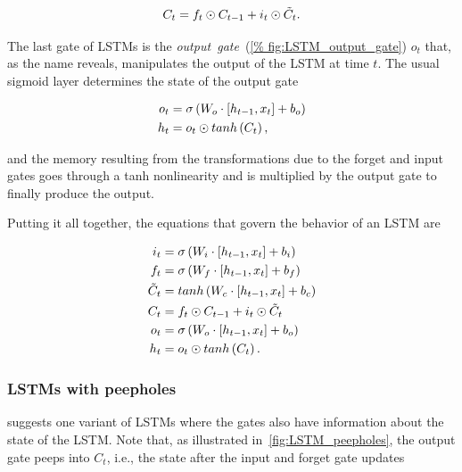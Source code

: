 \begin{equation}\label{eq:LSTM_state_update}
    C_t = f_t \odot C_{t-1} + i_t \odot \tilde C_t.
\end{equation}

The last gate of LSTMs is the \emph{output~gate}~(\autoref{%
fig:LSTM_output_gate}) $o_t$ that, as the name reveals, manipulates the output
of the LSTM at time $t$. The usual sigmoid layer determines the state of the
output gate

\begin{equation}\label{eq:LSTM_output_gate}
\begin{split}
    o_t &= \sigma\left(W_o \cdot \left[h_{t-1}, x_t\right] + b_o \right)\\
    h_t &= o_t \odot tanh \left(C_t\right),
\end{split}
\end{equation}

\noindent and the memory resulting from the transformations due to the forget and
input gates goes through a tanh nonlinearity and is multiplied by the output
gate to finally produce the output.

Putting it all together, the equations that govern the behavior of an LSTM are

\begin{equation}\label{eq:LSTM}
\begin{split}
    i_t &= \sigma\left(W_i \cdot \left[h_{t-1}, x_t\right] + b_i \right)\\
    f_t &= \sigma\left(W_f \cdot \left[h_{t-1}, x_t\right] + b_f \right)\\
    \tilde C_t &= tanh \left(W_c \cdot \left[h_{t-1}, x_t\right] + b_c \right)\\
    C_t &= f_t \odot C_{t-1} + i_t \odot \tilde C_t\\
    o_t &= \sigma\left(W_o \cdot \left[h_{t-1}, x_t\right] + b_o \right)\\
    h_t &= o_t \odot tanh \left(C_t\right).
\end{split}
\end{equation}


\subsubsection{LSTMs with peepholes}

\cite{gers2000recurrent} suggests one variant of LSTMs where the gates also
have information about the state of the LSTM. Note that, as illustrated
in~\autoref{fig:LSTM_peepholes}, the output gate peeps into $C_t$, i.e., the
state after the input and forget gate updates

